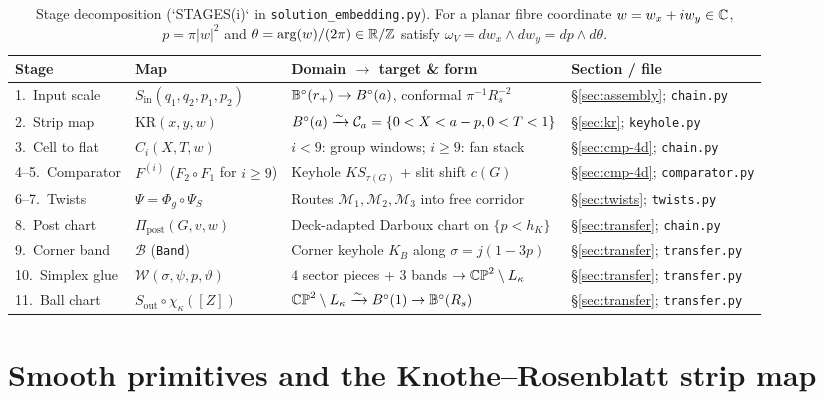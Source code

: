 \begin{table}[!htbp]
\centering\footnotesize
\renewcommand{\arraystretch}{1.15}
\begin{tabular}{@{}L{0.16\textwidth}L{0.23\textwidth}L{0.35\textwidth}L{0.18\textwidth}@{}}
\toprule
Stage & Map & Domain $\to$ target \& form & Section / file\\
.\ Input scale & $S_{\mathrm{in}}(q_1,q_2,p_1,p_2)$ & $\mathbb{B}^{\circ}(r_+)\to B^{\circ}(a)$, conformal $\pi^{-1}R_s^{-2}$ & \S\ref{sec:assembly}; \texttt{chain.py}\\
2.\ Strip map & $\mathrm{KR}(x,y,w)$ & $B^{\circ}(a)\xrightarrow{\sim}\mathcal C_a=\{0<X<a-p,0<T<1\}$ & \S\ref{sec:kr}; \texttt{keyhole.py}\\
3.\ Cell to flat & $C_i(X,T,w)$ & $i<9$: group windows; $i\ge9$: fan stack & \S\ref{sec:cmp-4d}; \texttt{chain.py}\\
4--5.\ Comparator & $F^{(i)}$ ($F_2\circ F_1$ for $i\ge9$) & Keyhole $KS_{\tau(G)}$ + slit shift $c(G)$ & \S\ref{sec:cmp-4d}; \texttt{comparator.py}\\
6--7.\ Twists & $\Psi=\Phi_g\circ\Psi_S$ & Routes $\mathcal M_1,\mathcal M_2,\mathcal M_3$ into free corridor & \S\ref{sec:twists}; \texttt{twists.py}\\
8.\ Post chart & $\Pi_{\mathrm{post}}(G,v,w)$ & Deck-adapted Darboux chart on $\{p<h_K\}$ & \S\ref{sec:transfer}; \texttt{chain.py}\\
9.\ Corner band & $\mathcal B$ (\texttt{Band}) & Corner keyhole $K_B$ along $\sigma=j(1-3p)$ & \S\ref{sec:transfer}; \texttt{transfer.py}\\
10.\ Simplex glue & $\mathcal W(\sigma,\psi,p,\vartheta)$ & $4$ sector pieces + $3$ bands $\to\mathbb{CP}^2\setminus L_\kappa$ & \S\ref{sec:transfer}; \texttt{transfer.py}\\
11.\ Ball chart & $S_{\mathrm{out}}\circ\chi_\kappa([Z])$ & $\mathbb{CP}^2\setminus L_\kappa\xrightarrow{\sim}B^{\circ}(1)\to\mathbb{B}^{\circ}(R_s)$ & \S\ref{sec:transfer}; \texttt{transfer.py}\\
\bottomrule
\end{tabular}
\caption{Stage decomposition (`STAGES(i)` in \texttt{solution\_embedding.py}). For a planar fibre coordinate
$w=w_x+iw_y\in\C$, $p=\pi|w|^2$ and $\theta=\arg(w)/(2\pi)\in\R/\Z$ satisfy $\omega_V=dw_x\wedge dw_y=dp\wedge d\theta$.}
\label{tab:stages}
\end{table}

\section{Smooth primitives and the Knothe--Rosenblatt strip map}\label{sec:prim}

